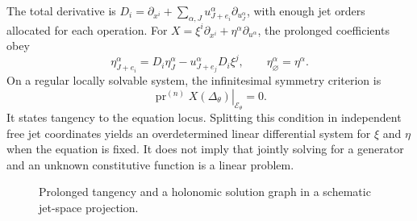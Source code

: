 \documentclass[11pt,a4paper,oneside]{report}
\numberwithin{equation}{chapter}
\newcommand{\E}{\mathcal E}
\newcommand{\pr}{\operatorname{pr}}
\begin{document}
The total derivative is $D_i=\partial_{x^i}+\sum_{\alpha,J}u^\alpha_{J+e_i}\partial_{u^\alpha_J}$, with enough jet orders allocated for each operation. For $X=\xi^i\partial_{x^i}+\eta^\alpha\partial_{u^\alpha}$, the prolonged coefficients obey
\begin{equation}\label{eq:prolong}
\eta^\alpha_{J+e_i}=D_i\eta^\alpha_J-u^\alpha_{J+e_j}D_i\xi^j,
\qquad \eta^\alpha_\varnothing=\eta^\alpha.
\end{equation}
On a regular locally solvable system, the infinitesimal symmetry criterion is \cite{olver1986,oliveri2026}
\begin{equation}\label{eq:criterion}
\left.\pr^{(n)}X(\Delta_\theta)\right|_{\E_\theta}=0.
\end{equation}
It states tangency to the equation locus. Splitting this condition in independent free jet coordinates yields an overdetermined linear differential system for $\xi$ and $\eta$ when the equation is fixed. It does not imply that jointly solving for a generator and an unknown constitutive function is a linear problem.

\begin{figure}[htbp]\centering
{}
\caption{Prolonged tangency and a holonomic solution graph in a schematic jet-space projection.}\label{fig:jet}
\end{figure}
\end{document}
